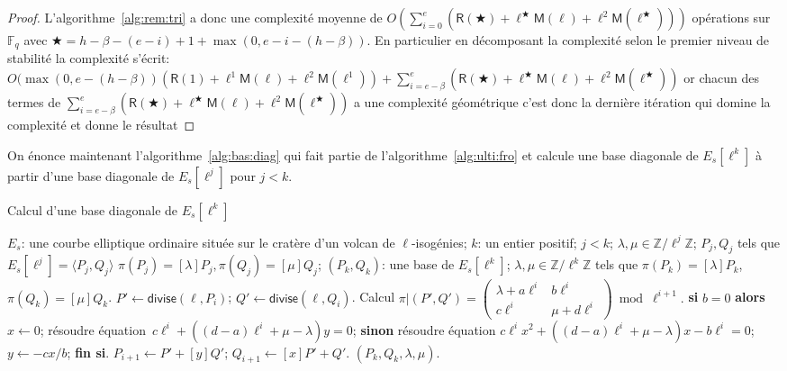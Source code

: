 \documentclass[10pt,a4paper]{book}
\theoremstyle{plain}
\theoremstyle{definition}
\theoremstyle{definition}
\theoremstyle{definition}
\theoremstyle{definition}
\theoremstyle{definition}
\theoremstyle{remark}
\theoremstyle{remark}
\theoremstyle{definition}
\begin{document}
\begin{proof}
L'algorithme~\ref{alg:rem:tri} a donc une complexité moyenne de 
$O(\sum_{i=0}^{e}(\mathsf{R}(\bigstar)+
\ell^{\bigstar}\mathsf{M}(\ell)+\ell^2 \mathsf{M}
(\ell^{\bigstar})))$ 
opérations sur $\mathbb{F}_q$ avec $\bigstar=h-\beta-(e-i)+1+\max(0,e-i-(h-\beta))$. 
En particulier en décomposant la complexité selon le premier niveau de 
stabilité la complexité s'écrit:
$
O(\max(0,e-(h-\beta))(\mathsf{R}(1)+
\ell^{1}\mathsf{M}(\ell)+\ell^2 \mathsf{M}(\ell^{1}))+
\sum_{i=e-\beta}^e(\mathsf{R}(\bigstar)+
\ell^{\bigstar}\mathsf{M}(\ell)+\ell^2 \mathsf{M}
(\ell^{\bigstar}))
$
or chacun des termes de $\sum_{i=e-\beta}^e(\mathsf{R}(\bigstar)+
\ell^{\bigstar}\mathsf{M}(\ell)+\ell^2 \mathsf{M}
(\ell^{\bigstar}))$ a une complexité géométrique c'est donc la dernière 
itération qui domine la complexité et donne le résultat
\end{proof}

On énonce maintenant l'algorithme~\ref{alg:bas:diag} qui fait partie de 
l'algorithme~\ref{alg:ulti:fro} et calcule une base diagonale de $E_s[\ell^k]$ à
partir d'une base diagonale de $E_s[\ell^j]$ pour $j<k$.

\begin{algorithm}
\caption{\label{alg:bas:diag}Calcul d'une base diagonale de $E_s[\ell^k]$}
\begin{algorithmic}[1]
\REQUIRE $E_s$: une courbe elliptique ordinaire située sur le cratère d'un volcan de $\ell$-isogénies; $k$: un entier positif; $j<k$; $\lambda, \mu \in \mathbb{Z}/\ell^{j}\mathbb{Z}$; $P_j,Q_j$ tels que $E_s[\ell^j]=\langle P_j,Q_j \rangle$ $\pi(P_j)=[\lambda] P_j, \pi(Q_j)=[\mu]Q_j$;
\ENSURE $(P_k, Q_k )$: une base de $E_s[\ell^k]$;
$\lambda, \mu \in \mathbb{Z}/\ell^k \mathbb{Z}$
tels que $\pi(P_k)= [\lambda] P_k$, $ \pi(Q_k)= [\mu] Q_k$.
\STATE\label{alg:diagonal:divide}
  $P' \leftarrow \mathsf{divise}(\ell, P_{i})$; $Q' \leftarrow \mathsf{divise} (\ell, Q_{i})$.
\STATE\label{alg:diagonal:frobenius}
  Calcul $\pi|(P',Q')=\left( \begin{smallmatrix}
\lambda + a\ell^{i} & b\ell^{i}\\
c\ell^{i} & \mu + d\ell^{i} \end{smallmatrix} \right) \bmod {\ell^{i+1}}.$
\STATE\label{alg:diagonal:solve1}
  \textbf{si} $b = 0$ \textbf{alors} $x \leftarrow 0$;
  résoudre équation~$c \ell^{i} + ((d-a) \ell^{i} + \mu-\lambda) y = 0$;
\STATE\label{alg:diagonal:solve2}
  \textbf{sinon} résoudre équation
  $c \ell^{i} x^2 + ((d-a) \ell^{i}+ \mu-\lambda) x - b \ell^{i} = 0$;
  $y \leftarrow -cx/b$; \textbf{fin si}.
\STATE\label{alg:diagonal:upd-P}
  $P_{i+1} \leftarrow P' + [y] Q'$; $Q_{i+1} \leftarrow [x] P' + Q'$.
\ENDFOR
\RETURN $(P_{k},Q_{k},\lambda,\mu).$
\end{algorithmic}
\end{algorithm}
\end{document}
